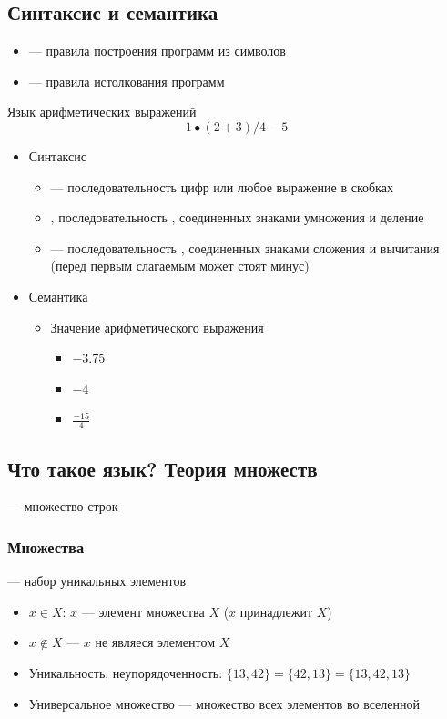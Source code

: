 \documentclass[a4paper, 14pt]{extarticle}
\begin{document}
\subsection{Синтаксис и семантика}
\begin{itemize}
    \item {} --- правила построения программ из символов
    \item {} --- правила истолкования программ
\end{itemize}
\begin{example}{Язык арифметических выражений}
    \[ 1 \bullet (2+3) / 4 - 5 \]
    \begin{itemize}
        \item Синтаксис
        \begin{itemize}
            \item {} --- последовательность цифр или любое выражение в скобках
            \item {}, последовательность , соединенных знаками умножения и деление
            \item {} --- последовательность , соединенных знаками сложения и вычитания (перед первым слагаемым может стоят минус)  
        \end{itemize}
        \item Семантика
        \begin{itemize}
            \item Значение арифметического выражения 
            \begin{itemize}
                \item $-3.75$
                \item $-4$
                \item $ \frac{-15}{4} $
            \end{itemize}
        \end{itemize}
    \end{itemize}
\end{example}

\subsection{Что такое язык? Теория множеств}
 --- множество строк

\subsubsection*{Множества}
 --- набор уникальных элементов
\begin{itemize}
    \item $x\in X$: $x$ --- элемент множества $X$ ($x$ принадлежит $X$)
    \item $x \notin X$ --- $x$ не являеся элементом $X$
    \item Уникальность, неупорядоченность: $\{13, 42\} = \{42, 13\} = \{13, 42, 13 \}$
    \item Универсальное множество --- множество всех элементов во вселенной
\end{itemize}
\end{document}
